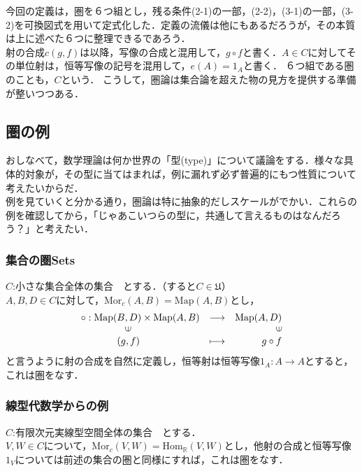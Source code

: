 \documentclass[uplatex, 12pt, a4paper, dvipdfmx]{jsarticle}
\begin{document}
今回の定義は，圏を６つ組とし，残る条件(2-1)の一部，(2-2)，(3-1)の一部，(3-2)を可換図式を用いて定式化した．定義の流儀は他にもあるだろうが，その本質は上に述べた６つに整理できるであろう．\\
射の合成$c(g,f)$は以降，写像の合成と混用して，$g\circ f$と書く．$A\in C$に対してその単位射は，恒等写像の記号を混用して，$e(A)=1_A$と書く．
６つ組である圏のことも，$C$という．
こうして，圏論は集合論を超えた物の見方を提供する準備が整いつつある．

\subsection{圏の例}
おしなべて，数学理論は何か世界の「型(type)」について議論をする．様々な具体的対象が，その型に当てはまれば，例に漏れず必ず普遍的にもつ性質について考えたいからだ．\\
例を見ていくと分かる通り，圏論は特に抽象的だしスケールがでかい．これらの例を確認してから，「じゃあこいつらの型に，共通して言えるものはなんだろう？」と考えたい．

\subsubsection{集合の圏\bf{Sets}}

$C$:小さな集合全体の集合　とする．（すると$C\in\mathfrak{U}$）\\
$A,B,D\in C$に対して，$\mathrm{Mor}_c(A,B)=\mathrm{Map}(A,B)$とし，$$\begin{array}{lcr}\circ : \mathrm{Map}(B,D)\times\mathrm{Map}(A,B)&\longrightarrow&\mathrm{Map}(A,D)\\ \hspace{16mm}\rotatebox{90}{$\in$} & & \rotatebox{90}{$\in$}\\ \hspace{13mm}(g,f) & \longmapsto & g\circ f \end{array}$$
と言うように射の合成を自然に定義し，恒等射は恒等写像$1_A:A\longrightarrow A$とすると，これは圏をなす．

\subsubsection{線型代数学からの例}

$C$:有限次元実線型空間全体の集合　とする．\\
$V,W\in C$について，$\mathrm{Mor}_c(V,W)=\mathrm{Hom}_\mathbb{R}(V,W)$とし，他射の合成と恒等写像$1_V$については前述の集合の圏と同様にすれば，これは圏をなす．
\end{document}
